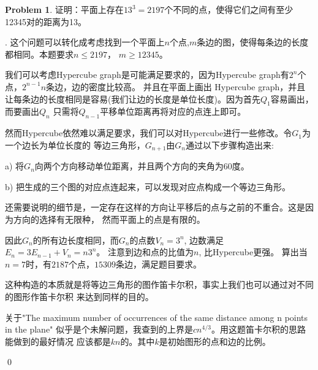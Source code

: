 \documentclass[UTF8]{ctexart}
\newenvironment{sol}
  {\par\vspace{3mm}\noindent{\it Solution}.}
  {\qed \\ \medskip}
\theoremstyle{definition}
\newtheorem{problem}{Problem}
\begin{document}
\begin{problem}
证明：平面上存在$13^3 = 2197$个不同的点，使得它们之间有至少12345对的距离为13。
\begin{sol}
    这个问题可以转化成考虑找到一个平面上$n$个点,$m$条边的图，使得每条边的长度都相同。本题要求$n\leq 2197$，
    $m \geq 12345$。

    我们可以考虑Hypercube graph是可能满足要求的，因为Hypercube graph有$2^n$个点，$2^{n-1}n$条边，边的密度比较高。
    并且在平面上画出 Hypercube graph，并且让每条边的长度相同是容易(我们让边的长度是单位长度)。因为首先$Q_1$容易画出，而要画出$Q_n$
    只需将$Q_{n-1}$平移单位距离再将对应的点连上即可。
    
    然而Hypercube依然难以满足要求，我们可以对Hypercube进行一些修改。令$G_1$为一个边长为单位长度的
    等边三角形，$G_{n+1}$由$G_{n}$通过以下步骤构造出来:

    a) 将$G_n$向两个方向移动单位距离，并且两个方向的夹角为$60$度。

    b) 把生成的三个图的对应点连起来，可以发现对应点构成一个等边三角形。

    还需要说明的细节是，一定存在这样的方向让平移后的点与之前的不重合。这是因为方向的选择有无限种，
    然而平面上的点是有限的。

    因此$G_n$的所有边长度相同，而$G_n$的点数$V_n=3^n$, 边数满足$E_n = 3E_{n-1} + V_n=n3^n$。
    注意到边和点的比值为$n$, 比Hypercube更强。 算出当$n=7$时，有$2187$个点，$15309$条边，满足题目要求。

    这种构造的本质就是将等边三角形的图作笛卡尔积，事实上我们也可以通过对不同的图形作笛卡尔积
    来达到同样的目的。

    关于"The maximum number of occurrences of the same distance among n points in the plane"
    似乎是个未解问题，我查到的上界是$cn^{4/3}$。用这题笛卡尔积的思路能做到的最好情况
    应该都是$kn$的。其中$k$是初始图形的点和边的比例。
    
\end{sol}
\end{problem}
\end{document}
